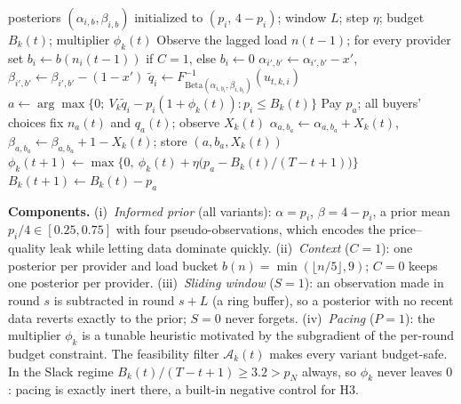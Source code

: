 \documentclass{article}
\begin{document}
\begin{algorithm}[h]
\caption{One round of the TS core for buyer $k$, with switches $P$ (pacing), $C$ (context), $S$ (window)}
\label{alg:pace}
\small
\begin{algorithmic}[1]
\Require posteriors $(\alpha_{i,b},\beta_{i,b})$ initialized to $(p_i,\,4-p_i)$; window $L$; step $\eta$; budget $B_k(t)$; multiplier $\phi_k(t)$
\State Observe the lagged load $n(t-1)$; for every provider set $b_i\gets b(n_i(t-1))$ if $C=1$, else $b_i\gets0$
  \State $\alpha_{i',b'}\gets\alpha_{i',b'}-x'$, \ $\beta_{i',b'}\gets\beta_{i',b'}-(1-x')$ 
\EndIf
{}
  \State $\tilde q_i\gets F^{-1}_{\mathrm{Beta}(\alpha_{i,b_i},\beta_{i,b_i})}(u_{t,k,i})$ 
\EndFor
\State $a\gets\arg\max\big\{0;\ V_k\tilde q_i-p_i(1+\phi_k(t)) : p_i\le B_k(t)\big\}$ 
\State Pay $p_a$; all buyers' choices fix $n_a(t)$ and $q_a(t)$; observe $X_k(t)$
  \State $\alpha_{a,b_a}\gets\alpha_{a,b_a}+X_k(t)$, \ $\beta_{a,b_a}\gets\beta_{a,b_a}+1-X_k(t)$; store $(a,b_a,X_k(t))$ 
\EndIf
{} $\phi_k(t+1)\gets\max\big\{0,\ \phi_k(t)+\eta\big(p_a-B_k(t)/(T-t+1)\big)\big\}$ \EndIf
\State $B_k(t+1)\gets B_k(t)-p_a$
\end{algorithmic}
\end{algorithm}

\textbf{Components.} (i)~\emph{Informed prior} (all variants): $\alpha=p_i$, $\beta=4-p_i$, a prior mean $p_i/4\in[0.25,0.75]$ with four pseudo-observations, which encodes the price--quality leak while letting data dominate quickly. (ii)~\emph{Context} ($C=1$): one posterior per provider and load bucket $b(n)=\min(\lfloor n/5\rfloor,9)$; $C=0$ keeps one posterior per provider. (iii)~\emph{Sliding window} ($S=1$): an observation made in round $s$ is subtracted in round $s+L$ (a ring buffer), so a posterior with no recent data reverts exactly to the prior; $S=0$ never forgets. (iv)~\emph{Pacing} ($P=1$): the multiplier $\phi_k$ is a tunable heuristic motivated by the subgradient of the per-round budget constraint. The feasibility filter $\mathcal A_k(t)$ makes every variant budget-safe. In the Slack regime $B_k(t)/(T-t+1)\ge3.2>p_N$ always, so $\phi_k$ never leaves $0$: pacing is exactly inert there, a built-in negative control for H3.
\end{document}

